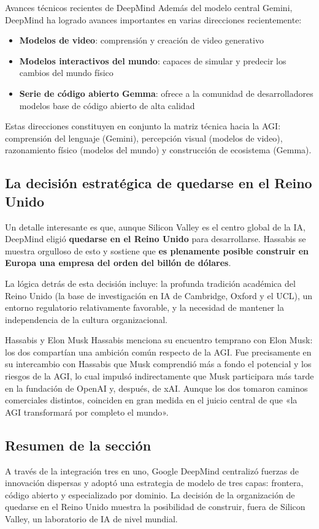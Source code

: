 \begin{knowledgebox}{Avances técnicos recientes de DeepMind}
Además del modelo central Gemini, DeepMind ha logrado avances importantes en varias direcciones recientemente:
\begin{itemize}
    \item \textbf{Modelos de video}: comprensión y creación de video generativo
    \item \textbf{Modelos interactivos del mundo}: capaces de simular y predecir los cambios del mundo físico
    \item \textbf{Serie de código abierto Gemma}: ofrece a la comunidad de desarrolladores modelos base de código abierto de alta calidad
\end{itemize}
Estas direcciones constituyen en conjunto la matriz técnica hacia la AGI: comprensión del lenguaje (Gemini), percepción visual (modelos de video), razonamiento físico (modelos del mundo) y construcción de ecosistema (Gemma).
\end{knowledgebox}

\subsection{La decisión estratégica de quedarse en el Reino Unido}

Un detalle interesante es que, aunque Silicon Valley es el centro global de la IA, DeepMind eligió \textbf{quedarse en el Reino Unido} para desarrollarse. Hassabis se muestra orgulloso de esto y sostiene que \textbf{es plenamente posible construir en Europa una empresa del orden del billón de dólares}.

La lógica detrás de esta decisión incluye: la profunda tradición académica del Reino Unido (la base de investigación en IA de Cambridge, Oxford y el UCL), un entorno regulatorio relativamente favorable, y la necesidad de mantener la independencia de la cultura organizacional.

\begin{knowledgebox}{Hassabis y Elon Musk}
Hassabis menciona su encuentro temprano con Elon Musk: los dos compartían una ambición común respecto de la AGI. Fue precisamente en su intercambio con Hassabis que Musk comprendió más a fondo el potencial y los riesgos de la AGI, lo cual impulsó indirectamente que Musk participara más tarde en la fundación de OpenAI y, después, de xAI. Aunque los dos tomaron caminos comerciales distintos, coinciden en gran medida en el juicio central de que «la AGI transformará por completo el mundo».
\end{knowledgebox}

\subsection{Resumen de la sección}

A través de la integración tres en uno, Google DeepMind centralizó fuerzas de innovación dispersas y adoptó una estrategia de modelo de tres capas: frontera, código abierto y especializado por dominio. La decisión de la organización de quedarse en el Reino Unido muestra la posibilidad de construir, fuera de Silicon Valley, un laboratorio de IA de nivel mundial.

